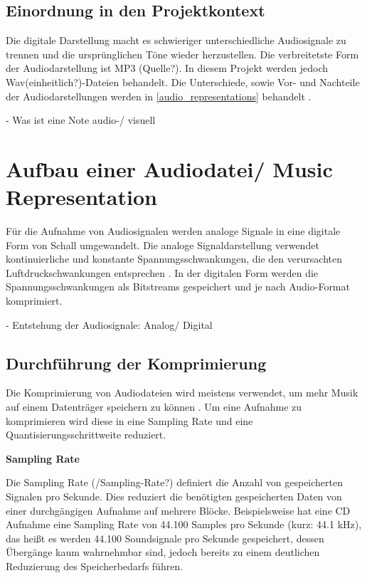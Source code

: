\subsection{Einordnung in den Projektkontext}

Die digitale Darstellung macht es schwieriger unterschiedliche Audiosignale zu trennen und die ursprünglichen Töne wieder herzustellen. Die verbreitetste Form der Audiodarstellung ist MP3 (Quelle?). In diesem Projekt werden jedoch Wav(einheitlich?)-Dateien behandelt. Die Unterschiede, sowie Vor- und Nachteile der Audiodarstellungen werden in \cref{audio_representations} behandelt \parencite{fundamentals_of_music_processing}.

 - Was ist eine Note audio-/ visuell

%
\section{Aufbau einer Audiodatei/ Music Representation}
%

Für die Aufnahme von Audiosignalen werden analoge Signale in eine digitale Form von Schall umgewandelt. Die analoge Signaldarstellung verwendet kontinuierliche und konstante Spannungsschwankungen, die den verursachten Luftdruckschwankungen entsprechen \parencite{digital_representation}. In der digitalen Form werden die Spannungsschwankungen als Bitstreams gespeichert und je nach Audio-Format komprimiert.

%
 - Entstehung der Audiosignale: Analog/ Digital

%
\subsection{Durchführung der Komprimierung}
%

Die Komprimierung von Audiodateien wird meistens verwendet, um mehr Musik auf einem Datenträger speichern zu können \parencite{what_is_audio_compression}. Um eine Aufnahme zu komprimieren wird diese in eine Sampling Rate und eine Quantisierungsschrittweite reduziert.

\par

%
\textbf{Sampling Rate}
%

Die Sampling Rate (/Sampling-Rate?) definiert die Anzahl von gespeicherten Signalen pro Sekunde. Dies reduziert die benötigten gespeicherten Daten von einer durchgängigen Aufnahme auf mehrere Blöcke. Beispielsweise hat eine CD Aufnahme eine Sampling Rate von 44.100 Samples pro Sekunde (kurz: 44.1 kHz), das heißt es werden 44.100 Soundsignale pro Sekunde gespeichert, dessen Übergänge kaum wahrnehmbar sind, jedoch bereits zu einem deutlichen Reduzierung des Speicherbedarfs führen.


